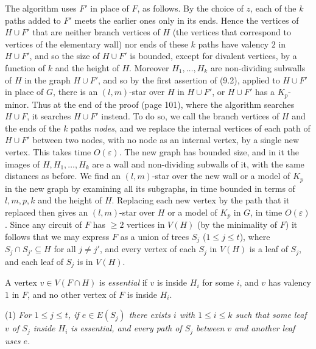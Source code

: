 {The algorithm uses $F'$ in place of $F$, as follows. By the choice of $z$, each of the $k$ paths added to $F'$ meets the earlier ones only in its ends. Hence the vertices of $H \cup F'$ that are neither branch vertices of $H$ (the vertices that correspond to vertices of the elementary wall) nor ends of these $k$ paths have valency $2$ in $H \cup F'$, and so the size of $H \cup F'$ is bounded, except for divalent vertices, by a function of $k$ and the height of $H$. Moreover $H_1, \dots, H_k$ are non-dividing subwalls of $H$ in the graph $H \cup F'$, and so by the first assertion of (9.2), applied to $H \cup F'$ in place of $G$, there is an $(l, m)$-star over $H$ in $H \cup F'$, or $H \cup F'$ has a $K_p$-minor. Thus at the end of the proof (page 101), where the algorithm searches $H \cup F$, it searches $H \cup F'$ instead. To do so, we call the branch vertices of $H$ and the ends of the $k$ paths \textit{nodes}, and we replace the internal vertices of each path of $H \cup F'$ between two nodes, with no node as an internal vertex, by a single new vertex. This takes time $O(\varepsilon)$. The new graph has bounded size, and in it the images of $H, H_1, \dots, H_k$ are a wall and non-dividing subwalls of it, with the same distances as before. We find an $(l, m)$-star over the new wall or a model of $K_p$ in the new graph by examining all its subgraphs, in time bounded in terms of $l, m, p, k$ and the height of $H$. Replacing each new vertex by the path that it replaced then gives an $(l, m)$-star over $H$ or a model of $K_p$ in $G$, in time $O(\varepsilon)$.} Since any circuit of $F$ has $\ge 2$ vertices in $V(H)$ (by the minimality of $F$) it follows that we may express $F$ as a union of trees $S_j$ ($1 \le j \le t$), where $S_j \cap S_{j'} \subseteq H$ for all $j \ne j'$, and every vertex of each $S_j$ in $V(H)$ is a leaf of $S_j$, and each leaf of $S_j$ is in $V(H)$.

A vertex $v \in V(F \cap H)$ is \textit{essential} if $v$ is inside $H_i$ for some $i$, and $v$ has valency $1$ in $F$, and no other vertex of $F$ is inside $H_i$.

\hspace*{12pt}(1) \textit{For $1 \le j \le t$, if $e \in E(S_j)$ there exists $i$ with $1 \le i \le k$ such that some leaf $v$ of $S_j$ inside $H_i$ is essential, and every path of $S_j$ between $v$ and another leaf uses $e$.}

